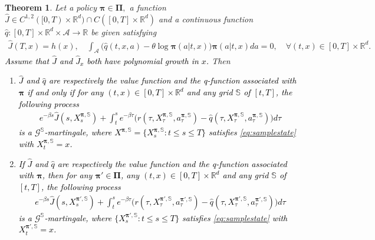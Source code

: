 \documentclass[11pt]{article}
\newtheorem{theorem}{Theorem}
\newcommand{\1}{\mathbbm{1}}
\newcommand{\rev}[1]{\textcolor{black}{{#1}}} %
\begin{document}
\begin{theorem}\label{thm:mart2}
Let a policy $\boldsymbol{\pi} \in \boldsymbol{\Pi},$ a function $\hat J \in C^{1,2}([0,T)\times\mathbb{R}^d)\cap C([0,T]\times\mathbb{R}^d)$ and a continuous function $\hat q: [0, T] \times \mathbb{R}^d \times \mathcal{A} \rightarrow \mathbb{R}$ be given satisfying
\begin{align}\label{eq:constraints}
	\hat J(T, x) = h (x), \quad  \int_{\mathcal{A}} \big(\hat q(t,x, a) - \theta \log \boldsymbol{\pi}(a| t,x)\big) \boldsymbol{\pi}(a|t,x) da =0, \quad \forall(t,x) \in [0, T] \times \mathbb{R}^d.
\end{align}
\rev{Assume that $\hat J$ and $\hat J_x$ both have polynomial growth in $x$.}
Then
\begin{enumerate}
	\item [(i)] \rev{$\hat J$ and $\hat q$ are respectively the value function and the q-function associated with $\boldsymbol{\pi}$ if and only if for any
	$(t,x) \in [0, T] \times \mathbb{R}^d $ and any grid $\mathbb{S}$ of $[t,T]$, the following process
	\begin{align}
		e^{-\beta s} \hat J(s, X_s^{ \boldsymbol{\pi} , \mathbb{S}}) +      \int_t^s e^{-\beta \tau } \big(r( \tau, X_{\tau}^{\boldsymbol{\pi} , \mathbb{S}}, a_{\tau}^{\boldsymbol{\pi},  \mathbb{S}}) - \hat q ( \tau, X_{\tau}^{\boldsymbol{\pi}, \mathbb{S}}, a_{\tau}^{\boldsymbol{\pi, \mathbb{S}}})\big) d\tau
	\end{align}
	is a $\mathcal{G}^{\mathbb{S}}$-martingale, where $X^{\boldsymbol{\pi}, \mathbb{S}} = \{X^{\boldsymbol{\pi}, \mathbb{S}}_s: t \le s \le T\}$ satisfies \eqref{eq:samplestate}  with $X^{\boldsymbol{\pi}, \mathbb{S}}_t =x$.}
	
	\item [(ii)] \rev{ If $\hat J$ and $\hat q$ are respectively the value function and the q-function associated with $\boldsymbol{\pi}$, then for any $\boldsymbol{\pi}' \in \boldsymbol{\Pi}$, any
	$(t,x) \in [0, T] \times \mathbb{R}^d $ and any grid $\mathbb{S}$ of $[t,T]$, the following process
	\begin{align} \label{eq:mart3}
		e^{-\beta s} \hat J(s, X_s^{ \boldsymbol{\pi}', \mathbb{S}}) +    \int_t^s e^{-\beta \tau} \big( r(\tau, X_{\tau}^{\boldsymbol{\pi}', \mathbb{S}}, a_{\tau}^{\boldsymbol{\pi}', \mathbb{S}}) - \hat q (\tau, X_{\tau}^{\boldsymbol{\pi}', \mathbb{S}}, a_{\tau}^{\boldsymbol{\pi}', \mathbb{S}})\big) d\tau
	\end{align}
	is a $\mathcal{G}^{\mathbb{S}}$-martingale, where  $ \{X^{\boldsymbol{\pi}', \mathbb{S}}_s: t \le s \le T\}$ satisfies  \eqref{eq:samplestate}  with $X^{\boldsymbol{\pi}', \mathbb{S}}_t =x$. }
	

\end{enumerate}
\end{theorem}
\end{document}
